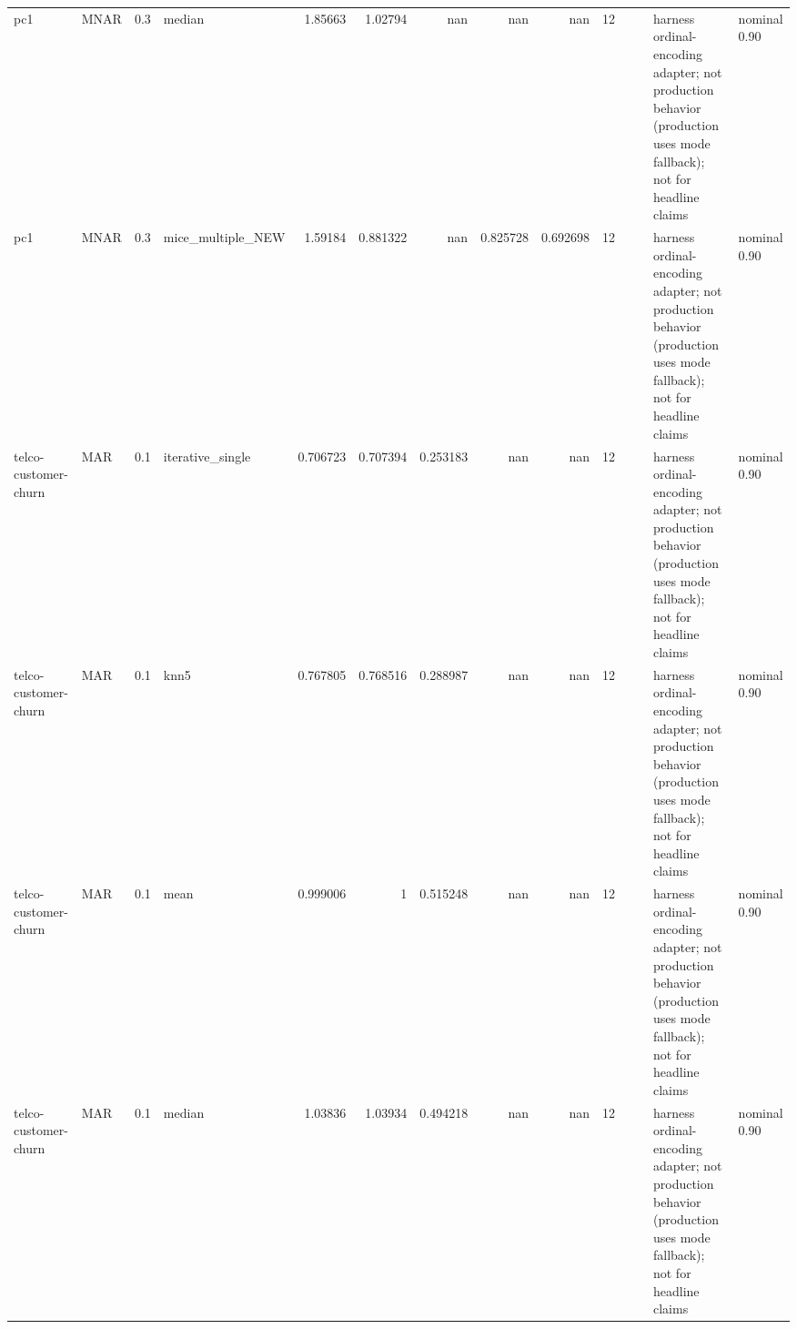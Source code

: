 \begin{table}[ht]
\begin{tabular}{llrlrrrrrrllll}
 pc1                  & MNAR        &         0.3 & median            &       1.85663  &             1.02794  &               nan        &                     nan        &                       nan        &        12 &                    &                                         & harness ordinal-encoding adapter; not production behavior (production uses mode fallback); not for headline claims & nominal 0.90              \\
 pc1                  & MNAR        &         0.3 & mice\_multiple\_NEW &       1.59184  &             0.881322 &               nan        &                       0.825728 &                         0.692698 &        12 &                    &                                         & harness ordinal-encoding adapter; not production behavior (production uses mode fallback); not for headline claims & nominal 0.90              \\
 telco-customer-churn & MAR         &         0.1 & iterative\_single  &       0.706723 &             0.707394 &                 0.253183 &                     nan        &                       nan        &        12 &                    &                                         & harness ordinal-encoding adapter; not production behavior (production uses mode fallback); not for headline claims & nominal 0.90              \\
 telco-customer-churn & MAR         &         0.1 & knn5              &       0.767805 &             0.768516 &                 0.288987 &                     nan        &                       nan        &        12 &                    &                                         & harness ordinal-encoding adapter; not production behavior (production uses mode fallback); not for headline claims & nominal 0.90              \\
 telco-customer-churn & MAR         &         0.1 & mean              &       0.999006 &             1        &                 0.515248 &                     nan        &                       nan        &        12 &                    &                                         & harness ordinal-encoding adapter; not production behavior (production uses mode fallback); not for headline claims & nominal 0.90              \\
 telco-customer-churn & MAR         &         0.1 & median            &       1.03836  &             1.03934  &                 0.494218 &                     nan        &                       nan        &        12 &                    &                                         & harness ordinal-encoding adapter; not production behavior (production uses mode fallback); not for headline claims & nominal 0.90              \\

\end{tabular}
\end{table}
